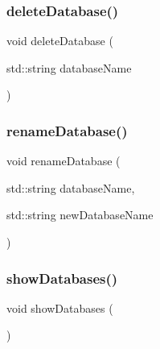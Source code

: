 \subsubsection{delete\+Database()}
{\footnotesize\ttfamily void delete\+Database (\begin{DoxyParamCaption}\item[{std\+::string}]{database\+Name }\end{DoxyParamCaption})}

\mbox{\label{database_8hpp_a0659d93a42f84756e52155eb333c4fec}} 
\subsubsection{rename\+Database()}
{\footnotesize\ttfamily void rename\+Database (\begin{DoxyParamCaption}\item[{std\+::string}]{database\+Name,  }\item[{std\+::string}]{new\+Database\+Name }\end{DoxyParamCaption})}

\mbox{\label{database_8hpp_a812cc82c697df37c6a8a482f85972b4b}} 
\subsubsection{show\+Databases()}
{\footnotesize\ttfamily void show\+Databases (\begin{DoxyParamCaption}{ }\end{DoxyParamCaption})}

